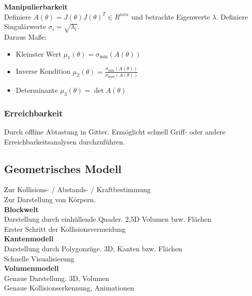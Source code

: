 \textbf{Manipulierbarkeit}\\
Definiere \(A(\theta) = J(\theta){J(\theta)}^T \in R^{nxn}\) und betrachte Eigenwerte \(\lambda\).
Definiere Singulärwerte \(\sigma_i = \sqrt{\lambda_i}\).\\
Daraus Maße:
\begin{itemize}
\item Kleinster Wert \(\mu_1 (\theta) = \sigma_{\min}(A(\theta))\)
\item Inverse Kondition \(\mu_2(\theta) = \frac{\sigma_{\min}(A(\theta))}{\sigma_{\max}(A(\theta))}\)
\item Determinante \(\mu_3(\theta) = \det A(\theta)\)
\end{itemize}

\subsubsection{Erreichbarkeit}%
\label{kin:ssub:erreichbarkeit}
Durch offline Abtastung in Gitter. Ermöglicht schnell Griff- oder andere Erreichbarkeitsanalysen durchzuführen.

\subsection{Geometrisches Modell}%
\label{kin:sub:geometrisches-modell}
Zur Kollisions- / Abstands- / Kraftbestimmung\\
Zur Darstellung von Körpern.\\

\textbf{Blockwelt}\\
Darstellung durch einhüllende Quader. 2,5D Volumen bzw. Flächen\\
Erster Schritt der Kollisionsvermeidung\\

\textbf{Kantenmodell}\\
Darstellung durch Polygonzüge. 3D, Kanten bzw. Flächen\\
Schnelle Visualisierung\\

\textbf{Volumenmodell}\\
Genaue Darstellung. 3D, Volumen\\
Genaue Kollisionserkennung, Animationen